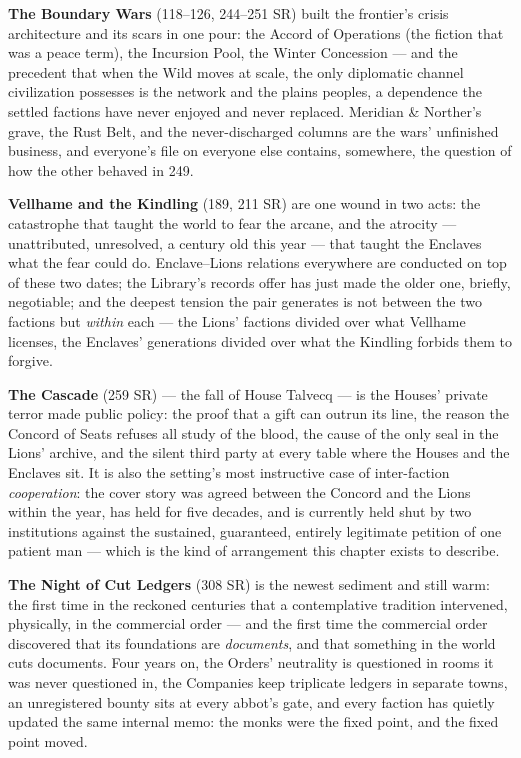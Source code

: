 \textbf{The Boundary Wars} (118--126, 244--251 SR) built the frontier's crisis architecture and its scars in one pour: the Accord of Operations (the fiction that was a peace term), the Incursion Pool, the Winter Concession --- and the precedent that when the Wild moves at scale, the only diplomatic channel civilization possesses is the network and the plains peoples, a dependence the settled factions have never enjoyed and never replaced. Meridian \& Norther's grave, the Rust Belt, and the never-discharged columns are the wars' unfinished business, and everyone's file on everyone else contains, somewhere, the question of how the other behaved in 249.

\textbf{Vellhame and the Kindling} (189, 211 SR) are one wound in two acts: the catastrophe that taught the world to fear the arcane, and the atrocity --- unattributed, unresolved, a century old this year --- that taught the Enclaves what the fear could do. Enclave--Lions relations everywhere are conducted on top of these two dates; the Library's records offer has just made the older one, briefly, negotiable; and the deepest tension the pair generates is not between the two factions but \textit{within} each --- the Lions' factions divided over what Vellhame licenses, the Enclaves' generations divided over what the Kindling forbids them to forgive.

\textbf{The Cascade} (259 SR) --- the fall of House Talvecq --- is the Houses' private terror made public policy: the proof that a gift can outrun its line, the reason the Concord of Seats refuses all study of the blood, the cause of the only seal in the Lions' archive, and the silent third party at every table where the Houses and the Enclaves sit. It is also the setting's most instructive case of inter-faction \textit{cooperation}: the cover story was agreed between the Concord and the Lions within the year, has held for five decades, and is currently held shut by two institutions against the sustained, guaranteed, entirely legitimate petition of one patient man --- which is the kind of arrangement this chapter exists to describe.

\textbf{The Night of Cut Ledgers} (308 SR) is the newest sediment and still warm: the first time in the reckoned centuries that a contemplative tradition intervened, physically, in the commercial order --- and the first time the commercial order discovered that its foundations are \textit{documents}, and that something in the world cuts documents. Four years on, the Orders' neutrality is questioned in rooms it was never questioned in, the Companies keep triplicate ledgers in separate towns, an unregistered bounty sits at every abbot's gate, and every faction has quietly updated the same internal memo: the monks were the fixed point, and the fixed point moved.

